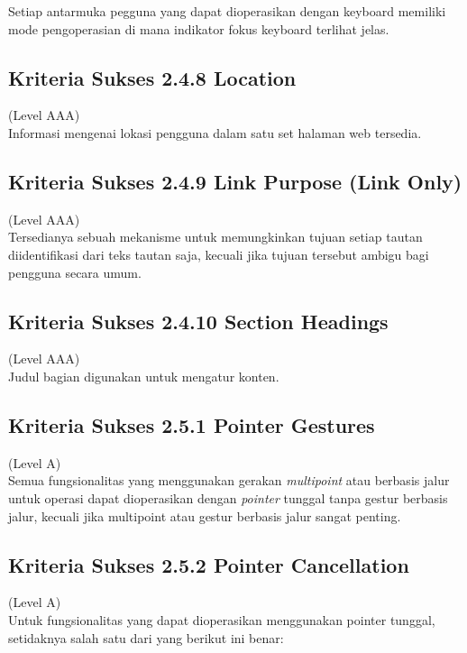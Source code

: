 Setiap antarmuka pegguna yang dapat dioperasikan dengan keyboard memiliki mode pengoperasian di mana indikator fokus keyboard terlihat jelas.

\subsection{Kriteria Sukses 2.4.8 Location}
\label{subsec:kriteria_2.4.8}
(Level AAA) \\

Informasi mengenai lokasi pengguna dalam satu set halaman web tersedia.

\subsection{Kriteria Sukses 2.4.9 Link Purpose (Link Only)}
\label{subsec:kriteria_2.4.9}
(Level AAA) \\

Tersedianya sebuah mekanisme untuk memungkinkan tujuan setiap tautan diidentifikasi dari teks tautan saja, kecuali jika tujuan tersebut ambigu bagi pengguna secara umum.

\subsection{Kriteria Sukses 2.4.10 Section Headings}
\label{subsec:kriteria_2.4.10}
(Level AAA) \\

Judul bagian digunakan untuk mengatur konten.

\subsection{Kriteria Sukses 2.5.1 Pointer Gestures}
\label{subsec:kriteria_2.5.1}
(Level A) \\

Semua fungsionalitas yang menggunakan gerakan \textit{multipoint} atau berbasis jalur untuk operasi dapat dioperasikan dengan \textit{pointer} tunggal tanpa gestur berbasis jalur, kecuali jika multipoint atau gestur berbasis jalur sangat penting.

\subsection{Kriteria Sukses 2.5.2 Pointer Cancellation}
\label{subsec:kriteria_2.5.2}
(Level A) \\

Untuk fungsionalitas yang dapat dioperasikan menggunakan pointer tunggal, setidaknya salah satu dari yang berikut ini benar:


